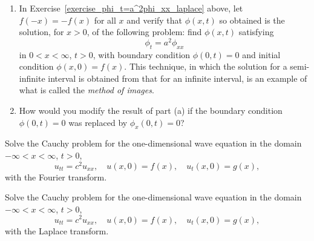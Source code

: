 {%
\begin{Exercise}
  \begin{enumerate}
  \item
    In Exercise~\ref{exercise_phi_t=a^2phi_xx_laplace} above, 
    let $f(-x) = -f(x)$ for
    all $x$ and verify that $\phi(x,t)$ so obtained is the solution,
    for $x > 0$, of the following problem: find $\phi(x,t)$ satisfying
    \[
    \phi_t = a^2\phi_{xx}
    \]
    in $0 < x < \infty$, $t > 0$, with boundary condition $\phi(0,t) = 0$
    and initial condition $\phi(x,0) = f(x)$. This technique, in which the
    solution for a semi-infinite interval is obtained from that for an
    infinite interval, 
    is an example of what is called the \textit{method of images}. 
  \item
    How would
    you modify the  result of part (a) if the boundary condition
    $\phi(0,t) = 0$ was replaced by $\phi_x(0,t) = 0$?
  \end{enumerate}
\end{Exercise}





\begin{Exercise}
  Solve the Cauchy problem for the one-dimensional wave equation in the
  domain $-\infty < x < \infty$, $t>0$,
  \[
  u_{tt} = c^2 u_{xx}, \quad u(x,0) = f(x), \quad u_t(x,0) = g(x),
  \]
  with the Fourier transform.
\end{Exercise}



\begin{Exercise}
  Solve the Cauchy problem for the one-dimensional wave equation in the
  domain $-\infty < x < \infty$, $t>0$,
  \[
  u_{tt} = c^2 u_{xx}, \quad u(x,0) = f(x), \quad u_t(x,0) = g(x),
  \]
  with the Laplace transform.
\end{Exercise}




}
